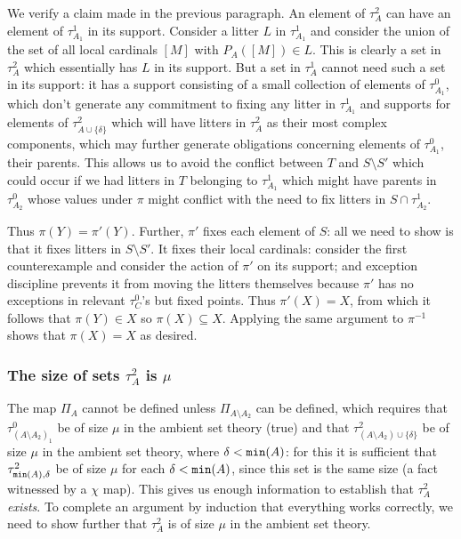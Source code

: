 \documentclass[12pt]{article}
\begin{document}
We verify a claim made in the previous paragraph.  An element of $\tau^2_A$
can have an element of $\tau^1_{A_1}$ in its support.  Consider a litter $L$ in $\tau^1_{A_1}$ and consider the union of the set of all local cardinals $[M]$ with $P_A([M]) \in L$.
This is clearly a set in $\tau^2_A$ which essentially has $L$ in its support.  But a set in $\tau^1_A$ cannot need such a set in its support:  it has a support consisting
of a small collection of elements of $\tau^0_{A_1}$, which don't generate any commitment to fixing any litter in $\tau^1_{A_1}$ and supports for elements of
$\tau^2_{A \cup \{\delta\}}$ which will have litters in $\tau^2_A$ as their most complex components, which may further generate obligations concerning elements
of $\tau^0_{A_1}$, their parents.  This allows us to avoid the conflict between $T$ and $S \setminus S'$ which could occur if we had litters in $T$ belonging to $\tau^1_{A_1}$ which might have parents in $\tau^0_{A_2}$ whose values under $\pi$ might conflict with the need to fix
litters in $S \cap \tau^1_{A_2}$.

Thus $\pi(Y) = \pi'(Y)$.  Further,
$\pi'$ fixes each element of $S$:  all we need to show is that it fixes litters in $S \setminus S'$.  It fixes their local cardinals:  consider the first counterexample and consider the action of
$\pi'$ on its support; and exception discipline prevents it from moving the litters themselves because $\pi'$ has no exceptions in relevant $\tau^0_C$'s but fixed points.
Thus $\pi'(X)=X$, from which it follows that $\pi(Y) \in X$ so $\pi(X) \subseteq X$.  Applying the same argument to $\pi^{-1}$ shows that $\pi(X)=X$ as desired.

\newpage

\subsubsection{The size of sets $\tau^2_A$ is $\mu$}

The map $\Pi_A$ cannot be defined unless  $\Pi_{A \setminus A_2}$ can be defined, which requires that $\tau^0_{(A \setminus A_2)_1}$ be of size $\mu$ in the ambient set theory (true)
and that $\tau^2_{(A \setminus A_2) \cup \{\delta\}}$ be of size $\mu$ in the ambient set theory, where $\delta <{\tt min}(A)$:  for this it is sufficient that $\tau^2_{{\tt min}(A),\delta}$ be
of size $\mu$ for each $\delta<{\tt min}(A)$, since this set is the same size (a fact witnessed by a $\chi$ map).  This gives us enough information to establish
that $\tau^2_A$ {\em exists\/}.  To complete an argument by induction that everything works correctly, we need to show further that $\tau^2_A$ is of size $\mu$ in the ambient set theory.
\end{document}
